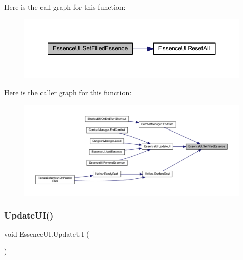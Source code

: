 Here is the call graph for this function\+:\nopagebreak
\begin{figure}[H]
\begin{center}
\leavevmode
\includegraphics[width=350pt]{class_essence_u_i_aac12f1c82310ceb94e259d9b6aa9bdfd_cgraph}
\end{center}
\end{figure}
Here is the caller graph for this function\+:\nopagebreak
\begin{figure}[H]
\begin{center}
\leavevmode
\includegraphics[width=350pt]{class_essence_u_i_aac12f1c82310ceb94e259d9b6aa9bdfd_icgraph}
\end{center}
\end{figure}
\mbox{\label{class_essence_u_i_a26023c3d4977188014384a1a40eb3ad9}} 
\subsubsection{\texorpdfstring{UpdateUI()}{UpdateUI()}}
{\footnotesize\ttfamily void Essence\+U\+I.\+Update\+UI (\begin{DoxyParamCaption}{ }\end{DoxyParamCaption})}

